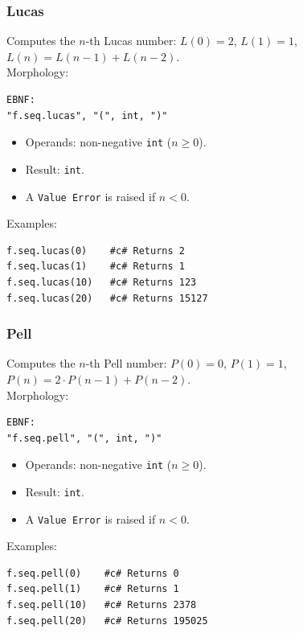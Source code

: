 \subsubsection{Lucas}
Computes the $n$-th Lucas number: $L(0) = 2$, $L(1) = 1$, $L(n) = L(n-1) + L(n-2)$.\\
Morphology:
\begin{verbatim}
EBNF:
"f.seq.lucas", "(", int, ")"
\end{verbatim}
\begin{itemize}
\item Operands: non-negative \texttt{int} ($n \geq 0$).
\item Result: \texttt{int}.
\item A \texttt{Value Error} is raised if $n < 0$.
\end{itemize}
Examples:
\begin{verbatim}
f.seq.lucas(0)    #c# Returns 2
f.seq.lucas(1)    #c# Returns 1
f.seq.lucas(10)   #c# Returns 123
f.seq.lucas(20)   #c# Returns 15127
\end{verbatim}

\subsubsection{Pell}
Computes the $n$-th Pell number: $P(0) = 0$, $P(1) = 1$, $P(n) = 2 \cdot P(n-1) + P(n-2)$.\\
Morphology:
\begin{verbatim}
EBNF:
"f.seq.pell", "(", int, ")"
\end{verbatim}
\begin{itemize}
\item Operands: non-negative \texttt{int} ($n \geq 0$).
\item Result: \texttt{int}.
\item A \texttt{Value Error} is raised if $n < 0$.
\end{itemize}
Examples:
\begin{verbatim}
f.seq.pell(0)    #c# Returns 0
f.seq.pell(1)    #c# Returns 1
f.seq.pell(10)   #c# Returns 2378
f.seq.pell(20)   #c# Returns 195025
\end{verbatim}

